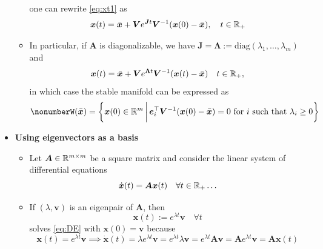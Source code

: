 \documentclass[12pt,a4paper]{article}
\begin{document}
\begin{itemize}
\begin{itemize}
    one can rewrite \eqref{eq:xt1} as
    \begin{equation}\nonumber%
      \bm{x}(t)
      = \bar{\bm{x}}
      + \bm{V}e^{\bm{J}t}\bm{V}^{-1}(\bm{x}(0)-\bar{\bm{x}}),
      \quad t \in \R_{+}
    \end{equation}
  \item In particular, if $\bm{A}$ is diagonalizable,
    we have $\bm{J}=\bm{\Lambda}:=\text{diag}(\lambda_{1},\ldots,\lambda_{m})$ and
    \begin{equation}\nonumber%
      \bm{x}(t) = \bar{\bm{x}} +  \bm{V}e^{\bm{\Lambda}t}\bm{V}^{-1}(\bm{x}(t)-\bar{\bm{x}})
      \quad t \in \R_{+},
    \end{equation}
    in which case the stable manifold can be expressed as
    \begin{equation}\nonumber%
      W(\bar{\bm{x}}) =
      \left\{ \bm{x}(0) \in \R^{m}
        \,\bigg|\,
        \text{$\bm{e}_{i}^{\top}\bm{V}^{-1}(\bm{x}(0)-\bar{\bm{x}}) = 0$ for $i$ such that $\lambda_{i}\geq 0$}
      \right\}
    \end{equation}

  \end{itemize}

\item \textbf{Using eigenvectors as a basis}

  \begin{itemize}
  \item Let $\bm{A}\in \mathbb{R}^{m\times m}$ be a square matrix and
    consider the linear system of differential equations
    \begin{equation}\label{eq:DE}%
      \dot{\bm{x}}(t) = \bm{A}\bm{x}(t) \quad \forall t\in \R_{+} \ldots
    \end{equation}
  \item If $(\lambda, \bm{v})$ is an eigenpair of $\bm{A}$,
    then 
    \begin{equation}\nonumber%
      \bm{x}(t) := e^{\lambda t}\bm{v} \quad \forall t
    \end{equation}
    solves \eqref{eq:DE} with $\bm{x}(0)=\bm{v}$ because
    \begin{equation}\nonumber%
      \bm{x}(t) = e^{\lambda t}\bm{v}
      \implies
      \dot{\bm{x}}(t)
      = \lambda e^{\lambda t}\bm{v}
      = e^{\lambda t}\lambda\bm{v}
      = e^{\lambda t}\bm{A} \bm{v}
      = \bm{A} e^{\lambda t}\bm{v}
      = \bm{A} \bm{x}(t)
    \end{equation}
    

\end{itemize}
\end{itemize}
\end{document}
